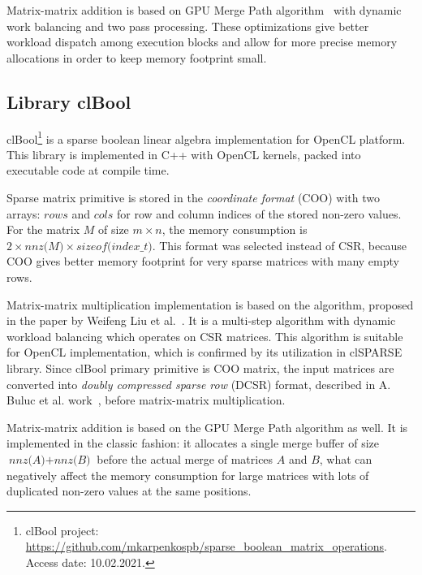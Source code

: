 Matrix-matrix addition is based on GPU Merge Path algorithm~\cite{inproceedings:gpu_merge_path} with dynamic work balancing and two pass processing.
These optimizations give better workload dispatch among execution blocks and allow for more precise memory allocations in order to keep memory footprint small.


\subsection{Library clBool}

clBool\footnote{clBool project: \url{https://github.com/mkarpenkospb/sparse_boolean_matrix_operations}. Access date: 10.02.2021.} 
is a sparse boolean linear algebra implementation for OpenCL platform.
This library is implemented in C++ with OpenCL kernels, packed into executable code at compile time. 

Sparse matrix primitive is stored in the \textit{coordinate format} (COO) with two arrays: $rows$ and $cols$ for row and column indices of the stored non-zero values.
For the matrix $M$ of size $m \times n$, the memory consumption is $2 \times \textit{nnz(M)} \times \textit{sizeof(index\_t)}$.
This format was selected instead of CSR, because COO gives better memory footprint for very sparse matrices with many empty rows.

Matrix-matrix multiplication implementation is based on the algorithm, proposed in the paper by Weifeng Liu et al.~\cite{DBLP:journals/corr/0002V15a:spframework}.
It is a multi-step algorithm with dynamic workload balancing which operates on CSR matrices.
This algorithm is suitable for OpenCL implementation, which is confirmed by its utilization in clSPARSE library.
Since clBool primary primitive is COO matrix, the input matrices are converted into \textit{doubly compressed sparse row} (DCSR) format, described in A. Buluc et al. work~\cite{4536313:about:dcsr}, before matrix-matrix multiplication.

Matrix-matrix addition is based on the GPU Merge Path algorithm as well.
It is implemented in the classic fashion: it allocates a single merge buffer of size $\textit{nnz(A)} + \textit{nnz(B)}$ before the actual merge of matrices $A$ and $B$, what can negatively affect the memory consumption for large matrices with lots of duplicated non-zero values at the same positions.
